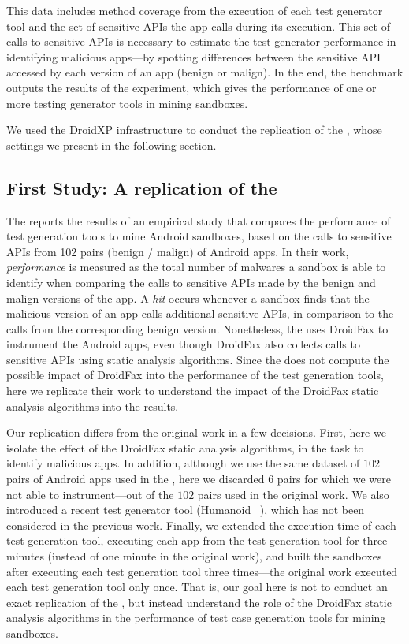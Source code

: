 This data includes method coverage from the execution of each test generator tool and the
set of sensitive APIs the app calls during its execution. This set of calls to
sensitive APIs is necessary to estimate the test generator performance in identifying malicious apps---by spotting
differences between the sensitive API accessed by each version of an app (benign or malign).
In the end, the benchmark outputs the results of the experiment, which gives the
performance of one or more testing generator tools in mining sandboxes.

We used the DroidXP infrastructure to conduct the replication of
the \blls, whose settings we present in the following section. 

\subsection{First Study: A replication of the \blls}\label{sec:set1}

The \blls reports the results of an empirical study that compares the performance of test generation tools to mine Android
sandboxes, based on the calls to sensitive APIs from 102 pairs (benign / malign) of Android apps. In their work, \emph{performance} is
measured as the total number of malwares a sandbox is able to identify when comparing the calls to sensitive APIs made by
the benign and malign versions of the app. A \emph{hit} occurs whenever a sandbox finds that the malicious version of an app calls
additional sensitive APIs, in comparison to the calls from the corresponding benign version.
Nonetheless, the \blls uses DroidFax to instrument the Android apps, even though DroidFax also
collects calls to sensitive APIs using static analysis algorithms. Since the \blls does not
compute the possible impact of DroidFax into the performance of the test generation tools,
here we replicate their work to understand the impact of the DroidFax static analysis algorithms into the \blls results.

Our replication differs from the original work in a few decisions. First, here we isolate
the effect of the DroidFax static analysis algorithms, in the task to identify malicious apps. In addition, although we use the same dataset of
$102$ pairs of Android apps used in the \blls, here we discarded $6$ pairs for which
we were not able to instrument---out of the $102$ pairs used in the original work. We also introduced a recent test generator tool (Humanoid ~\cite{DBLP:conf/kbse/LiY0C19}), which
has not been considered in the previous work. Finally, we extended the execution time of each test generation tool,
executing each app from the test generation tool for three minutes (instead of one minute in the
original work),
and built the sandboxes after executing each test generation tool
three times---the original work executed each test generation tool
only once. That is, our goal here is not to conduct an
exact replication of the \blls, but instead understand
the role of the DroidFax static analysis algorithms in the
performance of test case generation tools for mining sandboxes.

